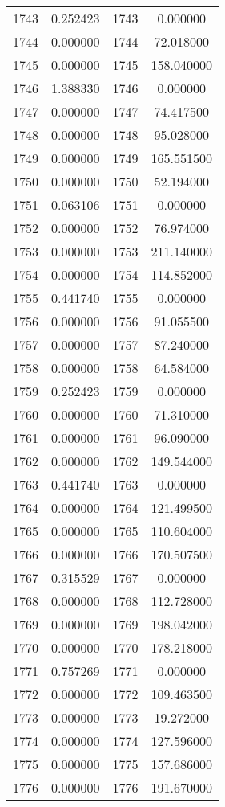 \documentclass[12pt]{article}
\begin{document}
\begin{longtable}{@{}cccc@{}}
1743 & 0.252423 & 1743 & 0.000000 \\
1744 & 0.000000 & 1744 & 72.018000 \\
1745 & 0.000000 & 1745 & 158.040000 \\
1746 & 1.388330 & 1746 & 0.000000 \\
1747 & 0.000000 & 1747 & 74.417500 \\
1748 & 0.000000 & 1748 & 95.028000 \\
1749 & 0.000000 & 1749 & 165.551500 \\
1750 & 0.000000 & 1750 & 52.194000 \\
1751 & 0.063106 & 1751 & 0.000000 \\
1752 & 0.000000 & 1752 & 76.974000 \\
1753 & 0.000000 & 1753 & 211.140000 \\
1754 & 0.000000 & 1754 & 114.852000 \\
1755 & 0.441740 & 1755 & 0.000000 \\
1756 & 0.000000 & 1756 & 91.055500 \\
1757 & 0.000000 & 1757 & 87.240000 \\
1758 & 0.000000 & 1758 & 64.584000 \\
1759 & 0.252423 & 1759 & 0.000000 \\
1760 & 0.000000 & 1760 & 71.310000 \\
1761 & 0.000000 & 1761 & 96.090000 \\
1762 & 0.000000 & 1762 & 149.544000 \\
1763 & 0.441740 & 1763 & 0.000000 \\
1764 & 0.000000 & 1764 & 121.499500 \\
1765 & 0.000000 & 1765 & 110.604000 \\
1766 & 0.000000 & 1766 & 170.507500 \\
1767 & 0.315529 & 1767 & 0.000000 \\
1768 & 0.000000 & 1768 & 112.728000 \\
1769 & 0.000000 & 1769 & 198.042000 \\
1770 & 0.000000 & 1770 & 178.218000 \\
1771 & 0.757269 & 1771 & 0.000000 \\
1772 & 0.000000 & 1772 & 109.463500 \\
1773 & 0.000000 & 1773 & 19.272000 \\
1774 & 0.000000 & 1774 & 127.596000 \\
1775 & 0.000000 & 1775 & 157.686000 \\
1776 & 0.000000 & 1776 & 191.670000 \\

\end{longtable}
\end{document}
